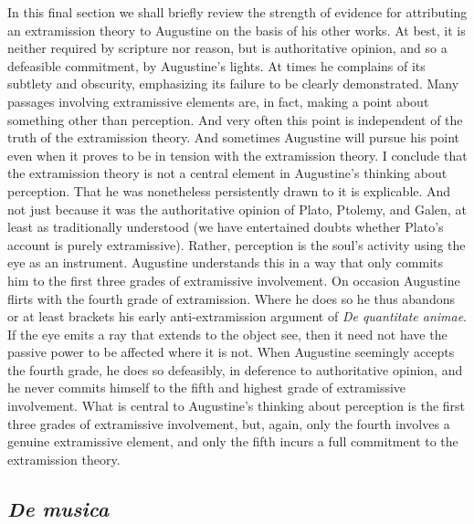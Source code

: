 \documentclass[12pt]{article}
\begin{document}
In this final section we shall briefly review the strength of evidence for attributing an extramission theory to Augustine on the basis of his other works. At best, it is neither required by scripture nor reason, but is authoritative opinion, and so a defeasible commitment, by Augustine's lights. At times he complains of its subtlety and obscurity, emphasizing its failure to be clearly demonstrated. Many passages involving extramissive elements are, in fact, making a point about something other than perception. And very often this point is independent of the truth of the extramission theory. And sometimes Augustine will pursue his point even when it proves to be in tension with the extramission theory. I conclude that the extramission theory is not a central element in Augustine's thinking about perception. That he was nonetheless persistently drawn to it is explicable. And not just because it was the authoritative opinion of Plato, Ptolemy, and Galen, at least as traditionally understood (we have entertained doubts whether Plato's account is purely extramissive). Rather, perception is the soul's activity using the eye as an instrument. Augustine understands this in a way that only commits him to the first three grades of extramissive involvement. On occasion Augustine flirts with the fourth grade of extramission. Where he does so he thus abandons or at least brackets his early anti-extramission argument of \emph{De quantitate animae}. If the eye emits a ray that extends to the object see, then it need not have the passive power to be affected where it is not. When Augustine seemingly accepts the fourth grade, he does so defeasibly, in deference to authoritative opinion, and he never commits himself to the fifth and highest grade of extramissive involvement. What is central to Augustine's thinking about perception is the first three grades of extramissive involvement, but, again, only the fourth involves a genuine extramissive element, and only the fifth incurs a full commitment to the extramission theory.

\subsection{\emph{De musica}} %
\label{sub:de_musica}
\end{document}
